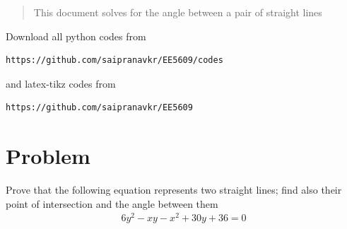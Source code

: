 \documentclass[journal,12pt,twocolumn]{IEEEtran}
\begin{document}
%
\begin{abstract}
This document solves for the angle between a pair of straight lines
\end{abstract}
Download all python codes from 
%
\begin{lstlisting}
https://github.com/saipranavkr/EE5609/codes
\end{lstlisting}
%
and latex-tikz codes from 
%
\begin{lstlisting}
https://github.com/saipranavkr/EE5609
\end{lstlisting}
%
\renewcommand{\theenumi}{\roman{enumi}}%
\section{Problem}
Prove that the following equation represents two straight lines; find also their point of intersection and the angle between them
\begin{align} 
    6y^{2}-xy-x^{2}+30y+36=0 \nonumber
\end{align}
%
%
\end{document}

